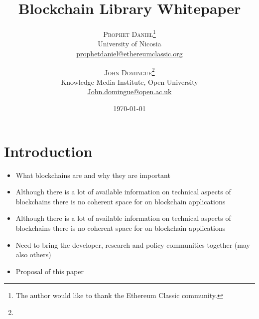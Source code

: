 \documentclass[twoside,twocolumn]{article}
\title{Blockchain Library Whitepaper} %
\author{%
\textsc{Prophet Daniel}\thanks{The author would like to thank the Ethereum Classic community.} \\[1ex] %
\normalsize University of Nicosia \\ %
\normalsize \href{mailto:prophetdaniel@ethereumclassic.org}{prophetdaniel@ethereumclassic.org} %
\and %
\textsc{John Domingue}\thanks{} \\[1ex] %
\normalsize Knowledge Media Institute, Open University \\ %
\normalsize \href{mailto:John.domingue@open.ac.uk}{John.domingue@open.ac.uk} %
}
\date{\today} %
\begin{document}
\maketitle


\section{Introduction}

\begin{itemize}
	\item What blockchains are and why they are important
	\item Although there is a lot of available information on technical aspects
	of blockchains there is no coherent space for on blockchain applications
	\item Although there is a lot of available information on technical aspects
	of blockchains there is no coherent space for on blockchain applications
	\item Need to bring the developer, research and policy
	communities together (may also others)
	\item Proposal of this paper
\end{itemize}
\end{document}
